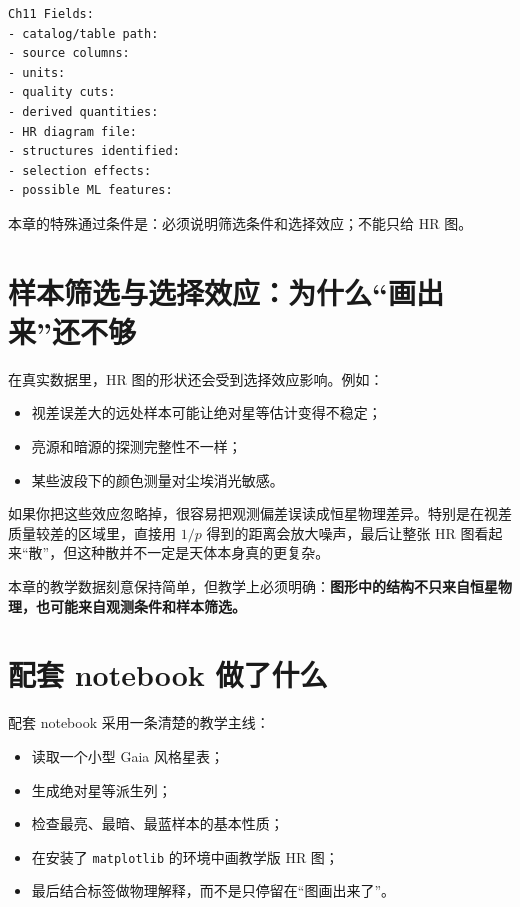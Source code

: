 \begin{examplebox}
\begin{lstlisting}[style=terminal]
Ch11 Fields:
- catalog/table path:
- source columns:
- units:
- quality cuts:
- derived quantities:
- HR diagram file:
- structures identified:
- selection effects:
- possible ML features:
\end{lstlisting}
\end{examplebox}

本章的特殊通过条件是：必须说明筛选条件和选择效应；不能只给 HR 图。

\section{样本筛选与选择效应：为什么“画出来”还不够}

在真实数据里，HR 图的形状还会受到选择效应影响。例如：

\begin{itemize}
    \item 视差误差大的远处样本可能让绝对星等估计变得不稳定；
    \item 亮源和暗源的探测完整性不一样；
    \item 某些波段下的颜色测量对尘埃消光敏感。
\end{itemize}

如果你把这些效应忽略掉，很容易把观测偏差误读成恒星物理差异。特别是在视差质量较差的区域里，直接用 $1/p$ 得到的距离会放大噪声，最后让整张 HR 图看起来“散”，但这种散并不一定是天体本身真的更复杂。

本章的教学数据刻意保持简单，但教学上必须明确：\textbf{图形中的结构不只来自恒星物理，也可能来自观测条件和样本筛选。}

\section{配套 notebook 做了什么}

配套 notebook 采用一条清楚的教学主线：

\begin{itemize}
    \item 读取一个小型 Gaia 风格星表；
    \item 生成绝对星等派生列；
    \item 检查最亮、最暗、最蓝样本的基本性质；
    \item 在安装了 \texttt{matplotlib} 的环境中画教学版 HR 图；
    \item 最后结合标签做物理解释，而不是只停留在“图画出来了”。
\end{itemize}


